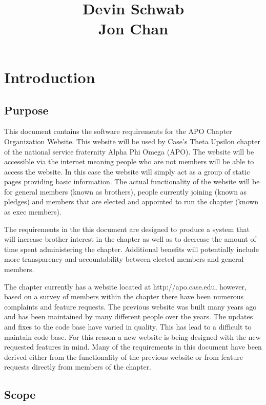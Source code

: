 \documentclass{article}
\title{\projName \\ \vspace{10 mm}
\docName \\\vspace{10 mm}
Devin Schwab\\
Jon Chan}
\date{\docDate}
\newcommand{\projName}{APO Chapter Organization Website}
\begin{document}
\maketitle

\newpage

\tableofcontents
\listoffigures

\newpage

\section{Introduction}
\subsection{Purpose}

\indent\indent This document contains the software requirements for the \projName. This website
will be used by Case's Theta Upsilon chapter of the national service fraternity Alpha Phi Omega (APO).
The website will be accessible via the internet meaning people who are not members will be able to access
the website. In this case the website will simply act as a group of static pages providing basic information.
The actual functionality of the website will be for general members (known as brothers), people currently joining (known as pledges) and members that are elected and appointed to run the chapter (known as exec members).

The requirements in the this document are designed to produce a system that will increase brother interest
in the chapter as well as to decrease the amount of time spent administering the chapter. Additional benefits will
potentially include more transparency and accountability between elected members and general members.

The chapter currently has a website located at http://apo.case.edu, however, based on a survey of members within
the chapter there have been numerous complaints and feature requests. The previous website was built many years ago
and has been maintained by many different people over the years. The updates and fixes to the code base have varied in
quality. This has lead to a difficult to maintain code base. For this reason a new website is being designed with the new
requested features in mind. Many of the requirements in this document have been derived either from the functionality
of the previous website or from feature requests directly from members of the chapter.

\subsection{Scope}
\end{document}
